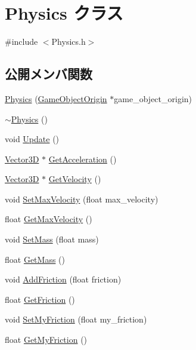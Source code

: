 \hypertarget{class_physics}{}\section{Physics クラス}
\label{class_physics}


{\ttfamily \#include $<$Physics.\+h$>$}

\subsection*{公開メンバ関数}
\begin{DoxyCompactItemize}
\item 
\mbox{\hyperlink{class_physics_af419194525721fccefec3ffde8fd8848}{Physics}} (\mbox{\hyperlink{class_game_object_origin}{Game\+Object\+Origin}} $\ast$game\+\_\+object\+\_\+origin)
\item 
\mbox{\hyperlink{class_physics_a045c3788e28059d3920136499942490f}{$\sim$\+Physics}} ()
\item 
void \mbox{\hyperlink{class_physics_a13bf3e9de07a12afc3c0a4012e00d0a1}{Update}} ()
\item 
\mbox{\hyperlink{class_vector3_d}{Vector3D}} $\ast$ \mbox{\hyperlink{class_physics_aee9ce4604f63dbdcab07ded4d0174989}{Get\+Acceleration}} ()
\item 
\mbox{\hyperlink{class_vector3_d}{Vector3D}} $\ast$ \mbox{\hyperlink{class_physics_a8e33f600575e7ee5ad348d695a9eb45e}{Get\+Velocity}} ()
\item 
void \mbox{\hyperlink{class_physics_afd9e36bb94e921a41818f261df4205d0}{Set\+Max\+Velocity}} (float max\+\_\+velocity)
\item 
float \mbox{\hyperlink{class_physics_a0ee3b82e3e1588fee1727e582c824467}{Get\+Max\+Velocity}} ()
\item 
void \mbox{\hyperlink{class_physics_a7a6eac8c5f6d7db0baef290710825085}{Set\+Mass}} (float mass)
\item 
float \mbox{\hyperlink{class_physics_a80a377efcd573cff3484d91c9f5512e4}{Get\+Mass}} ()
\item 
void \mbox{\hyperlink{class_physics_a77e9a04f034ccad4fec996832fb7ce63}{Add\+Friction}} (float friction)
\item 
float \mbox{\hyperlink{class_physics_aee1fe26db953d0712b2a26ce9d1db0d9}{Get\+Friction}} ()
\item 
void \mbox{\hyperlink{class_physics_a0e3c9825aa4129a2212c1c61d0cd6ecb}{Set\+My\+Friction}} (float my\+\_\+friction)
\item 
float \mbox{\hyperlink{class_physics_a50ad9d79f3b42a209a05f57557f294f0}{Get\+My\+Friction}} ()

\end{DoxyCompactItemize}
